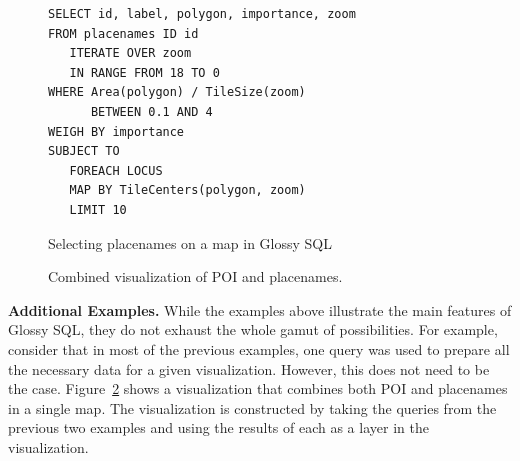 \documentclass[11pt, oneside]{report}
\newcommand{\minisec}[1]{\noindent\textbf{#1.}}
\begin{document}
\begin{figure}[!t]
\begin{center}
\begin{lstlisting}
SELECT id, label, polygon, importance, zoom
FROM placenames ID id
   ITERATE OVER zoom 
   IN RANGE FROM 18 TO 0
WHERE Area(polygon) / TileSize(zoom) 
      BETWEEN 0.1 AND 4
WEIGH BY importance
SUBJECT TO
   FOREACH LOCUS
   MAP BY TileCenters(polygon, zoom)
   LIMIT 10
\end{lstlisting}
\vspace*{-2ex}
\caption{Selecting placenames on a map in Glossy SQL}
\label{fig:glossy:sql:placenames}
\end{center}
\vspace*{-4ex}
\end{figure}

\begin{figure}[t]
\centering
{}
\vspace{-1ex}
\caption{Combined visualization of POI and placenames.} 
\label{fig:tourism:viz}
\vspace{-2ex}
\end{figure}

\minisec{Additional Examples}
While the examples above illustrate the main features of Glossy SQL, they do not exhaust the whole gamut of possibilities. For example, consider that in most of the previous examples, one query was used to prepare all the necessary data for a given visualization. However, this does not need to be the case. Figure~\ref{fig:tourism:viz} shows a visualization that combines both POI and placenames in a single map. The visualization is constructed by taking the queries from the previous two examples and using the results of each as a layer in the visualization. 
\end{document}

